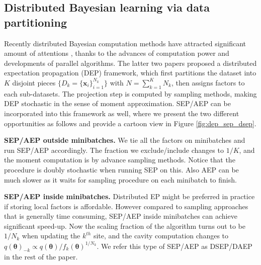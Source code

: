 \subsection{Distributed Bayesian learning via data partitioning}
Recently distributed Bayesian computation methods have attracted significant amount of attentions \cite{broderick:stream}\cite{gelman:dep}\cite{xu:sms}, thanks to the advances of computation power and developments of parallel algorithms. The latter two papers proposed a distributed expectation propagation (DEP) framework, which first partitions the dataset into $K$ disjoint pieces $\{ D_k = \{\bm{x}_i\}_{i=1}^{N_k} \}$ with $N = \sum_{k=1}^K N_k$, then assigns factors to each sub-datasets. The projection step is computed by sampling methods, making DEP stochastic in the sense of moment approximation. SEP/AEP can be incorporated into this framework as well, where we present the two different opportunities as follows and provide a cartoon view in Figure \ref{fig:dep_sep_dsep}.

\textbf{SEP/AEP outside minibatches.} We tie all the factors on minibatches and run SEP/AEP accordingly. The fraction we exclude/include changes to $1/K$, and the moment computation is by advance sampling methods. Notice that the procedure is doubly stochastic when running SEP on this. Also AEP can be much slower as it waits for sampling procedure on each minibatch to finish.

\textbf{SEP/AEP inside minibatches.} Distributed EP might be preferred in practice if storing local factors is affordable. However compared to sampling approaches that is generally time consuming, SEP/AEP inside minibatches can achieve significant speed-up. Now the scaling fraction of the algorithm turns out to be $1/N_k$ when updating the $k^{th}$ site, and the cavity computation changes to $q(\bm{\theta})_{-k} \propto q(\bm{\theta}) / f_k(\bm{\theta})^{1 / N_k}$. We refer this type of SEP/AEP as DSEP/DAEP in the rest of the paper.


